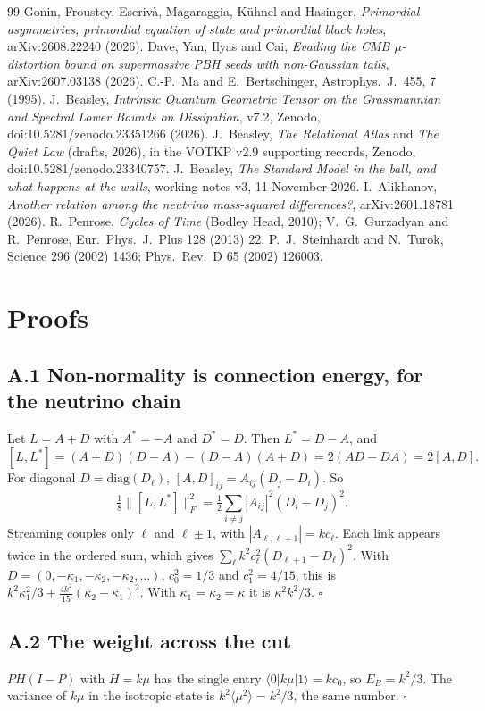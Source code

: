 \documentclass[11pt]{article}
\begin{document}
\begin{thebibliography}{99}
 Gonin, Froustey, Escriv\`a, Magaraggia, K\"uhnel and Hasinger, \emph{Primordial asymmetries, primordial equation of state and primordial black holes}, arXiv:2608.22240 (2026).
 Dave, Yan, Ilyas and Cai, \emph{Evading the CMB $\mu$-distortion bound on supermassive PBH seeds with non-Gaussian tails}, arXiv:2607.03138 (2026).
 C.-P.~Ma and E.~Bertschinger, Astrophys.\ J.\ 455, 7 (1995).
 J.~Beasley, \emph{Intrinsic Quantum Geometric Tensor on the Grassmannian and Spectral Lower Bounds on Dissipation}, v7.2, Zenodo, doi:10.5281/zenodo.23351266 (2026).
 J.~Beasley, \emph{The Relational Atlas} and \emph{The Quiet Law} (drafts, 2026), in the VOTKP v2.9 supporting records, Zenodo, doi:10.5281/zenodo.23340757.
 J.~Beasley, \emph{The Standard Model in the ball, and what happens at the walls}, working notes v3, 11 November 2026.
 I.~Alikhanov, \emph{Another relation among the neutrino mass-squared differences?}, arXiv:2601.18781 (2026).
 R.~Penrose, \emph{Cycles of Time} (Bodley Head, 2010); V.~G.~Gurzadyan and R.~Penrose, Eur.\ Phys.\ J.\ Plus 128 (2013) 22.
 P.~J.~Steinhardt and N.~Turok, Science 296 (2002) 1436; Phys.\ Rev.\ D 65 (2002) 126003.
\end{thebibliography}

\appendix
\section{Proofs}
\subsection*{A.1 Non-normality is connection energy, for the neutrino chain}
Let $L=A+D$ with $A^\ast=-A$ and $D^\ast=D$. Then $L^\ast=D-A$, and
\[
[L,L^\ast]=(A+D)(D-A)-(D-A)(A+D)=2(AD-DA)=2[A,D].
\]
For diagonal $D=\mathrm{diag}(D_\ell)$, $[A,D]_{ij}=A_{ij}(D_j-D_i)$. So
\[
\tfrac18\lVert[L,L^\ast]\rVert_F^2=\tfrac12\sum_{i\neq j}|A_{ij}|^2(D_i-D_j)^2 .
\]
Streaming couples only $\ell$ and $\ell\pm1$, with $|A_{\ell,\ell+1}|=kc_\ell$. Each link appears twice in the ordered sum, which gives $\sum_\ell k^2c_\ell^2(D_{\ell+1}-D_\ell)^2$. With $D=(0,-\kappa_1,-\kappa_2,-\kappa_2,\dots)$, $c_0^2=1/3$ and $c_1^2=4/15$, this is $k^2\kappa_1^2/3+\tfrac{4k^2}{15}(\kappa_2-\kappa_1)^2$. With $\kappa_1=\kappa_2=\kappa$ it is $\kappa^2k^2/3$. $\square$
\subsection*{A.2 The weight across the cut}
$PH(I-P)$ with $H=k\mu$ has the single entry $\langle0|k\mu|1\rangle=kc_0$, so $E_B=k^2/3$. The variance of $k\mu$ in the isotropic state is $k^2\langle\mu^2\rangle=k^2/3$, the same number. $\square$
\end{document}
